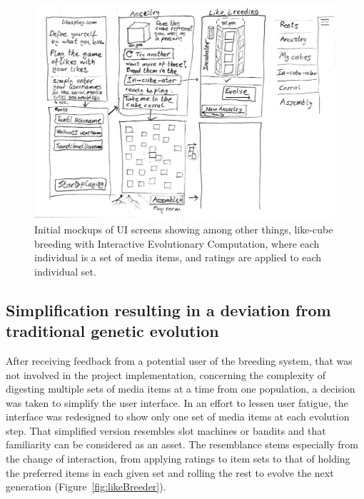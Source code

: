 \documentclass[]{article}
\begin{document}
\begin{figure}[htp]
	\centerline{\includegraphics[width=\textwidth]{breederUImockup.png}}
	\caption{Initial mockups of UI screens showing among other things, like-cube breeding with Interactive Evolutionary Computation, where each individual is a set of media items, and ratings are applied to each individual set.}
	\label{fig:breedingMockup}
\end{figure}


\subsection{Simplification resulting in a deviation from traditional genetic evolution}

After receiving feedback from a potential user of the breeding system, that was not involved in the project implementation, concerning the complexity of digesting multiple sets of media items at a time from one population, a decision was taken to simplify the user interface.  In an effort to lessen user fatigue, the interface was redesigned to show only one set of media items at each evolution step.  That simplified version resembles slot machines or bandits and that familiarity can be considered as an asset.  The resemblance stems especially from the change of interaction, from applying ratings to item sets to that of holding the preferred items in each given set and rolling the rest to evolve the next generation (Figure~\ref{fig:likeBreeder}).
\end{document}
